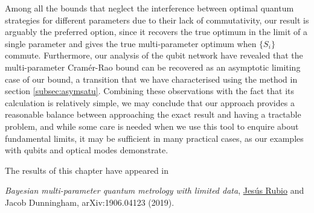 Among all the bounds that neglect the interference between optimal quantum strategies for different parameters due to their lack of commutativity, our result is arguably the preferred option, since it recovers the true optimum in the limit of a single parameter and gives the true multi-parameter optimum when $\lbrace S_i \rbrace$ commute. Furthermore, our analysis of the qubit network have revealed that the multi-parameter Cram\'{e}r-Rao bound can be recovered as an asymptotic limiting case of our bound, a transition that we have characterised using the method in section \ref{subsec:asymsatu}. Combining these observations with the fact that its calculation is relatively simple, we may conclude that our approach provides a reasonable balance between approaching the exact result and having a tractable problem, and while some care is needed when we use this tool to enquire about fundamental limits, it may be sufficient in many practical cases, as our examples with qubits and optical modes demonstrate. 

The results of this chapter have appeared in \cite{jesus2019b}
\begin{displayquote}
\emph{Bayesian multi-parameter quantum metrology with limited data}, \underline{Jes\'{u}s Rubio} and Jacob Dunningham, arXiv:1906.04123 (2019).
\end{displayquote}